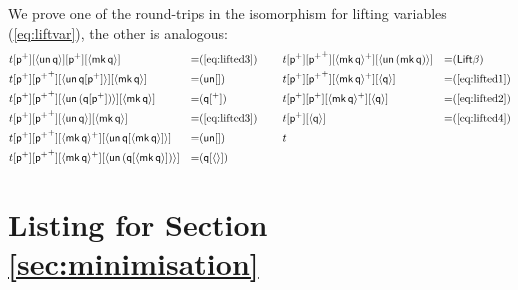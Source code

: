 \documentclass[submission,copyright,creativecommons]{eptcs}
\newcommand{\p}{\mathsf{p}}
\newcommand{\q}{\mathsf{q}}
\newcommand{\Lift}{\mathsf{Lift}}
\newcommand{\mk}{\mathsf{mk}}
\newcommand{\un}{\mathsf{un}}
\begin{document}
\vspace{-0.5em}
\noindent We prove one of the round-trips in the isomorphism for lifting
variables (\ref{eq:liftvar}), the other is analogous:
\begin{alignat*}{10}
  & t[\p^+][\langle\un\,\q\rangle][\p^+][\langle\mk\,\q\rangle] && {=}(\ref{eq:lifted3})                                  &&    t[\p^+][{\p^+}^+][\langle\mk\,\q\rangle^+][\langle\un\,(\mk\,\q)\rangle] && {=}(\Lift\beta) \\
  & t[\p^+][{\p^+}^+][\langle\un\,\q[\p^+]\rangle][\langle\mk\,\q\rangle] && {=}(\un[])                                   &&    t[\p^+][{\p^+}^+][\langle\mk\,\q\rangle^+][\langle\q\rangle] && {=}(\ref{eq:lifted1}) \\      
  & t[\p^+][{\p^+}^+][\langle\un\,(\q[\p^+])\rangle][\langle\mk\,\q\rangle] && {=}(\q[^+])                                &&    t[\p^+][\p^+][\langle\mk\,\q\rangle^+][\langle\q\rangle] && {=}(\ref{eq:lifted2}) \\          
  & t[\p^+][{\p^+}^+][\langle\un\,\q\rangle][\langle\mk\,\q\rangle] && {=}(\ref{eq:lifted3})                              &&    t[\p^+][\langle\q\rangle] && {=}(\ref{eq:lifted4}) \\                                         
  & t[\p^+][{\p^+}^+][\langle\mk\,\q\rangle^+][\langle\un\,\q[\langle\mk\,\q\rangle]\rangle] && {=}(\un[])                &&    t                                                                                             \\
  & t[\p^+][{\p^+}^+][\langle\mk\,\q\rangle^+][\langle\un\,(\q[\langle\mk\,\q\rangle])\rangle] && {=}(\q[\langle\rangle]) \hspace{4em} && 
\end{alignat*}

\section{Listing for Section \ref{sec:minimisation}}
\label{app:minimisation}
\end{document}
